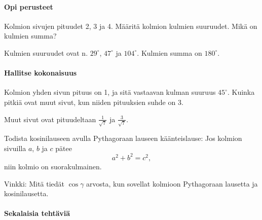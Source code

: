 \paragraph*{Opi perusteet}

\begin{tehtava}
Kolmion sivujen pituudet 2, 3 ja 4. Määritä kolmion kulmien suuruudet. Mikä on kulmien summa?
\begin{vastaus}
Kulmien suuruudet ovat n. $29^\circ$, $47^\circ$ ja $104^\circ$. Kulmien summa on $180^\circ$.
\end{vastaus}
\end{tehtava}

\paragraph*{Hallitse kokonaisuus}

\begin{tehtava}
Kolmion yhden sivun pituus on 1, ja sitä vastaavan kulman suuruus $45^\circ$. Kuinka pitkiä ovat muut sivut, kun niiden pituuksien suhde on 3.

\begin{vastaus}
Muut sivut ovat pituudeltaan $\frac{1}{\sqrt{7}}$ ja $\frac{3}{\sqrt{7}}$.
\end{vastaus}
\end{tehtava}

\begin{tehtava}
Todista kosinilauseen avulla Pythagoraan lauseen käänteislause: Jos kolmion sivuilla $a$, $b$ ja $c$ pätee
\[
a^2+b^2 = c^2,
\]
niin kolmio on suorakulmainen.

\begin{vastaus}
Vinkki: Mitä tiedät $\cos \gamma$ arvosta, kun sovellat kolmioon Pythagoraan lausetta ja kosinilausetta.
\end{vastaus}
\end{tehtava}

\paragraph*{Sekalaisia tehtäviä}